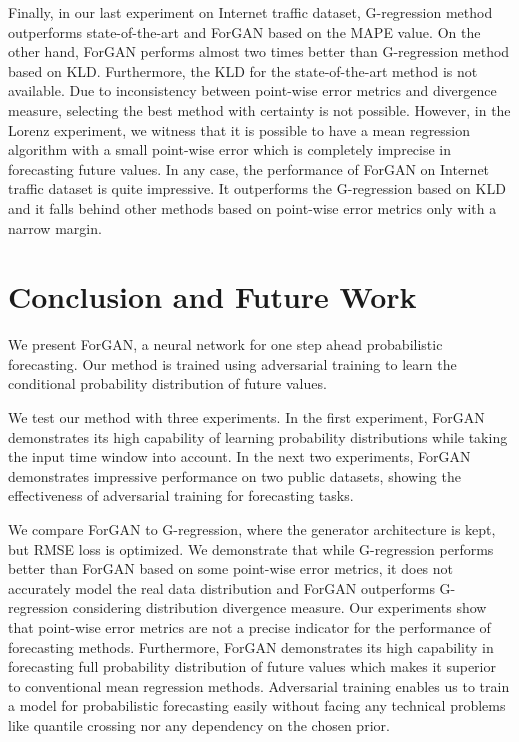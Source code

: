 \documentclass{ieeeaccess}
\begin{document}
\medskip

Finally, in our last experiment on Internet traffic dataset, G-regression method outperforms state-of-the-art and ForGAN based on the MAPE value. On the other hand, ForGAN performs almost two times better than G-regression method based on KLD. Furthermore, the KLD for the state-of-the-art method is not available. Due to inconsistency between point-wise error metrics and divergence measure, selecting the best method with certainty is not possible.
However, in the Lorenz experiment, we witness that it is possible to have a mean regression algorithm with a small point-wise error which is completely imprecise in forecasting future values. In any case, the performance of ForGAN on Internet traffic dataset is quite impressive. It outperforms the G-regression based on KLD and it falls behind other methods based on point-wise error metrics only with a narrow margin.
\section{Conclusion and Future Work}
\label{sec:conclusion}
We present ForGAN, a neural network for one step ahead probabilistic forecasting. Our method is trained using adversarial training to learn the conditional probability distribution of future values.

We test our method with three experiments. In the first experiment, ForGAN demonstrates its high capability of learning probability distributions while taking the input time window into account. In the next two experiments, ForGAN demonstrates impressive performance on two public datasets, showing the effectiveness of adversarial training for forecasting tasks.

We compare ForGAN to G-regression, where the generator architecture is kept, but RMSE loss is optimized. We demonstrate that while G-regression performs better than ForGAN based on some point-wise error metrics, it does not accurately model the real data distribution and ForGAN outperforms G-regression considering distribution divergence measure. Our experiments show that point-wise error metrics are not a precise indicator for the performance of forecasting methods. Furthermore, ForGAN demonstrates its high capability in forecasting full probability distribution of future values which makes it superior to conventional mean regression methods. Adversarial training enables us to train a model for probabilistic forecasting easily without facing any technical problems like quantile crossing nor any dependency on the chosen prior.
\end{document}
